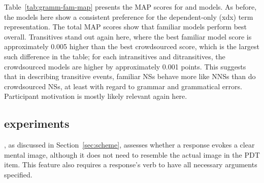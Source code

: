 Table~\ref{tab:gramm-fam-map} presents the  MAP scores for  and  models. As before, the models here show a consistent preference for the dependent-only (xdx) term representation. The total MAP scores show that familiar models perform best overall. Transitives stand out again here, where the best familiar model score is approximately 0.005 higher than the best crowdsourced score, which is the largest such difference in the table; for each intransitives and ditransitives, the crowdsourced models are higher by approximately 0.001 points. This suggests that in describing transitive events, familiar NSs behave more like NNSs than do crowdsourced NSs, at least with regard to grammar and grammatical errors. Participant motivation is mostly likely relevant again here.

\subsection{ experiments}
\label{sec:map-interp}

, as discussed in Section~\ref{sec:scheme}, assesses whether a response evokes a clear mental image, although it does not need to resemble the actual image in the PDT item. This feature also requires a response's verb to have all necessary arguments specified.

